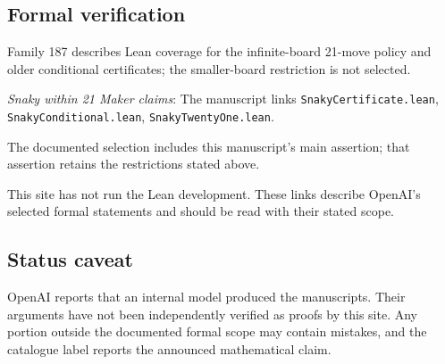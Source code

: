\documentclass[11pt]{article}
\begin{document}
\subsection{Formal verification}
Family 187 describes Lean coverage for the infinite-board 21-move policy and older conditional certificates; the smaller-board restriction is not selected.

\textit{Snaky within 21 Maker claims}: The manuscript links \texttt{SnakyCertificate.lean}, \texttt{SnakyConditional.lean}, \texttt{SnakyTwentyOne.lean}.

The documented selection includes this manuscript’s main assertion; that assertion retains the restrictions stated above.

This site has not run the Lean development. These links describe OpenAI’s selected formal statements and should be read with their stated scope.

\subsection{Status caveat}
OpenAI reports that an internal model produced the manuscripts. Their arguments have not been independently verified as proofs by this site. Any portion outside the documented formal scope may contain mistakes, and the catalogue label reports the announced mathematical claim.
\end{document}
